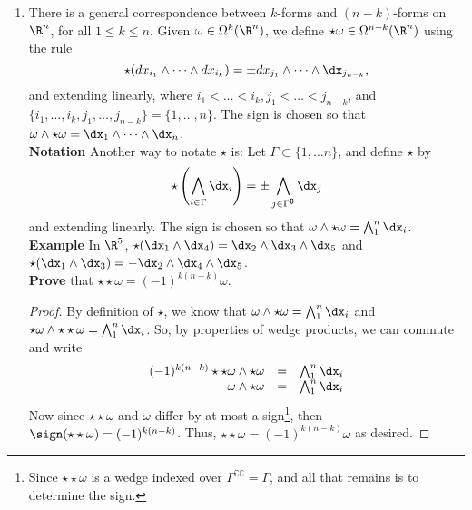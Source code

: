\documentclass[letterpaper]{article}
\begin{document}
\begin{enumerate}
\begin{proof}
\[\begin{array}{rcl}
			&>&0\\
		\end{array}\]
		Thus, we have produced a collection of parameterizations $\{\psi_x\}_{x\in M}$ covering $M$ for which all $\psi_{x_1}, \psi_{x_2}$ induce the same orientation on $M_x$ whenever $x\in V_{x_1}\cup V_{x_2}$, so $M$ is orientable. 
		\end{proof}		
	\item There is a general correspondence between $k$-forms and $(n-k)$-forms on $\R^n$, for all $1\leq k\leq n$. Given $\omega	\in \Omega^k(\R^n)$, we define $\star\omega\in\Omega^{n-k}(\R^n)$ using the rule 
	$$\star(dx_{i_1}\wedge\dots\wedge dx_{i_k})=\pm dx_{j_1}\wedge\dots\wedge\dx_{j_{n-k}},$$
	and extending linearly, where $i_1<\dots<i_k, j_1<\dots<j_{n-k}$, and $\{i_1,\dots,i_k, j_1,\dots,j_{n-k}\}=\{1, \dots, n\}$. The sign is chosen so that $\omega\wedge\star\omega = \dx_1\wedge\dots\wedge\dx_n$. \\
	\textbf{Notation} Another way to notate $\star$ is: Let $\Gamma\subset\{1, \dots n\}$, and define $\star$ by 
	\[\star\left(\bigwedge_{i\in\Gamma}\dx_i\right)=\pm\bigwedge_{j\in\Gamma^\complement}\dx_j\]
	and extending linearly. The sign is chosen so that $\omega\wedge\star\omega=\bigwedge_1^n\dx_i$. \\
	\textbf{Example} In $\R^5$, $\star(\dx_1\wedge\dx_4)=\dx_2\wedge\dx_3\wedge\dx_5$ and $\star(\dx_1\wedge\dx_3)=-\dx_2\wedge\dx_4\wedge\dx_5$. \\
	\textbf{Prove} that $\star\star\omega=(-1)^{k(n-k)}\omega$. 
	\begin{proof}
		By definition of $\star$, we know that $\omega\wedge\star\omega=\bigwedge_1^n\dx_i$ and $\star\omega\wedge\star\star\omega=\bigwedge_1^n\dx_i$. So, by properties of wedge products, we can commute and write 
		\[\begin{array}{rcl}
			(-1)^{k(n-k)}\star\star\omega\wedge\star\omega&=&\bigwedge_1^n\dx_i\\
			\omega\wedge\star\omega&=&\bigwedge_1^n\dx_i\\
		\end{array}\]
		Now since $\star\star\omega$ and $\omega$ differ by at most a sign\footnote{Since $\star\star\omega$ is a wedge indexed over $\Gamma^{\complement\complement}=\Gamma$, and all that remains is to determine the sign.}, then $\sign(\star\star\omega)=(-1)^{k(n-k)}$. Thus, $\star\star\omega=(-1)^{k(n-k)}\omega$ as desired. 
	\end{proof}
	
\end{enumerate}
\end{document}
